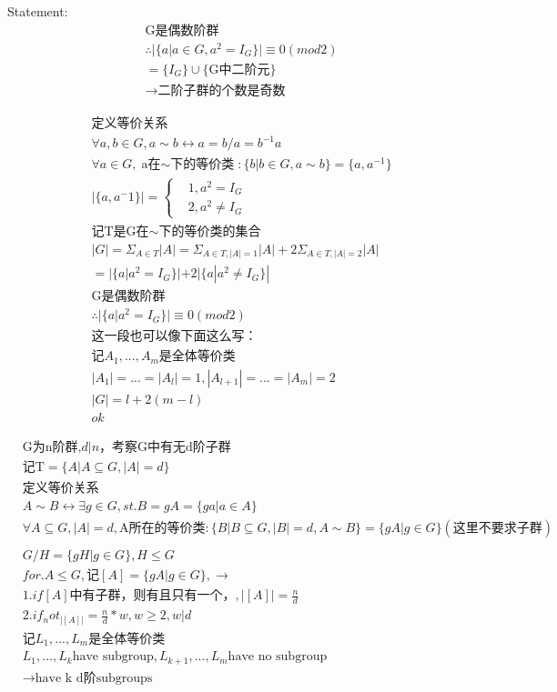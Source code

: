 \documentclass[12pt, a4paper]{article}  %
\begin{document}
Statement:
\begin{align}
    &\text{G是偶数阶群}\\
    &\therefore |\{a|a\in G,a^2=I_G\}|\equiv 0(mod 2)\\
    &=\{I_G\}\cup \{\text{G中二阶元}\}\\
    &\rightarrow \text{二阶子群的个数是奇数}
\end{align}

\begin{align}
    &\text{定义等价关系}\\
    &\forall a,b\in G,a\sim b \leftrightarrow a=b/a=b^{-1}a\\
    &\forall a\in G,\text{a在\(\sim\)下的等价类}:\{b|b\in G,a\sim b\}=\{a,a^{-1}\}\\
    &|\{a,a^-1\}|=\left\{
        \begin{aligned}
        &1,a^2=I_G\\
        &2,a^2\neq I_G
        \end{aligned}
    \right.\\
    &\text{记T是G在\(\sim\)下的等价类的集合}\\
    &|G|=\Sigma_{A\in T}|A|=\Sigma_{A\in T,|A|=1}|A|+2\Sigma_{A\in T,|A|=2}|A|\\
    &=|\{a|a^2=I_G\}|+2|\{a|a^2\neq I_G\}|\\
    &\text{G是偶数阶群}\\
    &\therefore |\{a|a^2=I_G\}|\equiv 0(mod 2)\\
    &\text{这一段也可以像下面这么写：}\\
    & \text{记}A_1,...,A_m\text{是全体等价类}\\
    &|A_1|=...=|A_l|=1,|A_{l+1}|=...=|A_m|=2\\
    &|G|=l+2(m-l)\\
    &ok
\end{align}

\begin{align}
    &\text{G为n阶群,\(d|n\)，考察G中有无d阶子群}\\
    &\text{记T}=\{A|A\subseteq G,|A|=d\}\\
    &\text{定义等价关系}\\
    &A\sim B \leftrightarrow \exists g\in G,st. B=gA=\{ga|a\in A\}\\
    &\forall A\subseteq G,|A|=d,\text{A所在的等价类}:\{B|B\subseteq G,|B|=d,A\sim B\}=\{gA|g\in G\}(\text{这里不要求子群})\\
    &\\
    &G/H=\{gH|g\in G\},H\leqslant G\\
    &for.A\leqslant G,\text{记}[A]=\{gA|g\in G\},\rightarrow\\
    &1.if[A]\text{中有子群，则有且只有一个，},|[A]|=\frac{n}{d}\\
    &2.if_not_ |[A]|=\frac{n}{d}*w,w\geqslant 2,w|d\\
    &\text{记}L_1,...,L_m\text{是全体等价类}\\
    &L_1,...,L_k\text{have subgroup},L_{k+1},...,L_m\text{have no subgroup}\\
    &\rightarrow \text{have k d阶subgroups }
\end{align}
\end{document}

